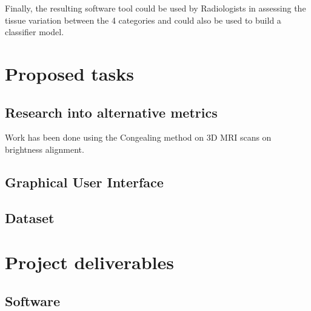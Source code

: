 \documentclass[11pt,fleqn,twoside]{article}
\begin{document}
Finally, the resulting software tool could be used by Radiologists in assessing the tissue variation between the 4 categories and could also be used to build a classifier model.

\section{Proposed tasks}

\subsection{Research into alternative metrics}
Work has been done using the Congealing method on 3D MRI scans on brightness alignment.

\subsection{Graphical User Interface}

\subsection{Dataset}

\section{Project deliverables}

\subsection{Software}


\nocite{*} %

\newpage
{}

%
%

\renewcommand{\refname}{Annotated Bibliography}  %
\end{document}
